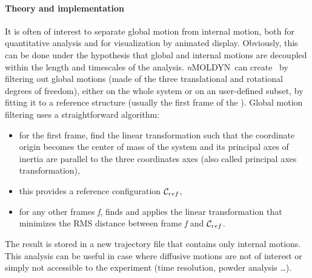 \documentclass[a4paper,11pt]{report}
\newcommand{\NMOLDYN}{\textit{n}MOLDYN}
\begin{document}
\paragraph{Theory and implementation\\}
\label{gmft_theory}
It is often of interest to separate global motion from internal motion, both for quantitative analysis 
and for visualization by animated display. Obviously, this can be done under the hypothesis that global and internal 
motions are decoupled within the length and timescales of the analysis. \NMOLDYN\ can create \GMFT\ by filtering out global 
motions (made of the three translational and rotational degrees of freedom), either on the whole system or on an user-defined subset, 
by fitting it to a reference structure (usually the first frame of the \MD). Global motion filtering uses a straightforward 
algorithm:
\begin{itemize}
\item for the first frame, find the linear transformation such that the coordinate origin becomes the center of mass of 
the system and its principal axes of inertia are parallel to the three coordinates axes (also called principal axes 
transformation),
\item this provides a reference configuration ${\cal C}_{ref}$,
\item for any other frames \textit{f}, finds and applies the linear transformation that minimizes the RMS distance between 
frame \textit{f} and ${\cal C}_{ref}$.
\end{itemize} 
The result is stored in a new trajectory file that contains only internal motions. This analysis can be useful in case where diffusive 
motions are not of interest or simply not accessible to the experiment (time resolution, powder analysis \ldots).
\end{document}
